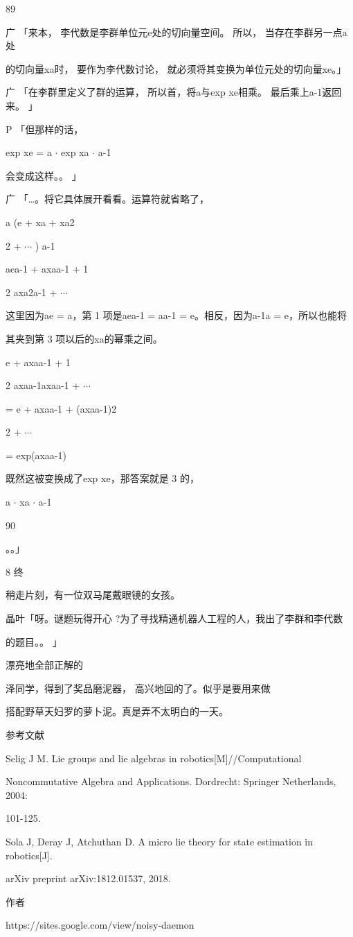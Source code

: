 89\par
广 「来本， 李代数是李群单位元e处的切向量空间。 所以， 当存在李群另一点a处\par
的切向量xa时， 要作为李代数讨论， 就必须将其变换为单位元处的切向量xe。」\par
广 「在李群里定义了群的运算， 所以首，将a与exp xe相乘。 最后乘上a-1返回来。 」\par
P 「但那样的话，\par
exp xe = a $\cdot$ exp xa $\cdot$ a-1\par
会变成这样。。 」\par
广 「…。将它具体展开看看。运算符就省略了，\par
a (e + xa + xa2\par
2 + $\cdots$ ) a-1\par
aea-1 + axaa-1 + 1\par
2 axa2a-1 + $\cdots$\par
这里因为ae = a，第 1 项是aea-1 = aa-1 = e。相反，因为a-1a = e，所以也能将\par
其夹到第 3 项以后的xa的幂乘之间。\par
e + axaa-1 + 1\par
2 axaa-1axaa-1 + $\cdots$\par
= e + axaa-1 + (axaa-1)2\par
2 + $\cdots$\par
= exp(axaa-1)\par
既然这被变换成了exp xe，那答案就是 3 的，\par
a $\cdot$ xa $\cdot$ a-1\par

90\par
。。」\par
8 终\par
稍走片刻，有一位双马尾戴眼镜的女孩。\par
晶叶「呀。谜题玩得开心 ?为了寻找精通机器人工程的人，我出了李群和李代数\par
的题目。。 」\par
漂亮地全部正解的\par
泽同学，得到了奖品磨泥器， 高兴地回的了。似乎是要用来做\par
搭配野草天妇罗的萝卜泥。真是弄不太明白的一天。\par
参考文献\par
[1] Selig J M. Lie groups and lie algebras in robotics[M]//Computational\par
Noncommutative Algebra and Applications. Dordrecht: Springer Netherlands, 2004:\par
101-125.\par
[2] Sola J, Deray J, Atchuthan D. A micro lie theory for state estimation in robotics[J].\par
arXiv preprint arXiv:1812.01537, 2018.\par
作者\par
https://sites.google.com/view/noisy-daemon\par

